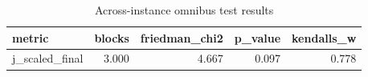 \begin{table}[!t]
\centering
\caption{Across-instance omnibus test results}
\label{tab:friedman_omnibus_generated}
\begin{tabular}{lrrrr}
\toprule
metric & blocks & friedman_chi2 & p_value & kendalls_w \\
\midrule
j_scaled_final & 3.000 & 4.667 & 0.097 & 0.778 \\
\bottomrule
\end{tabular}

\end{table}